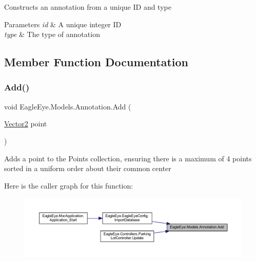 Constructs an annotation from a unique ID and type 


\begin{DoxyParams}{Parameters}
{\em id} & A unique integer ID\\
\hline
{\em type} & The type of annotation\\
\hline
\end{DoxyParams}


\subsection{Member Function Documentation}
\mbox{\label{class_eagle_eye_1_1_models_1_1_annotation_a47912a5775f0ead932d1cddb43213cd1}} 
\subsubsection{\texorpdfstring{Add()}{Add()}}
{\footnotesize\ttfamily void Eagle\+Eye.\+Models.\+Annotation.\+Add (\begin{DoxyParamCaption}\item[{\mbox{\hyperlink{struct_eagle_eye_1_1_models_1_1_geometry_1_1_vector2}{Vector2}}}]{point }\end{DoxyParamCaption})}



Adds a point to the Points collection, ensuring there is a maximum of 4 points sorted in a uniform order about their common center 

Here is the caller graph for this function\+:
\nopagebreak
\begin{figure}[H]
\begin{center}
\leavevmode
\includegraphics[width=350pt]{class_eagle_eye_1_1_models_1_1_annotation_a47912a5775f0ead932d1cddb43213cd1_icgraph}
\end{center}
\end{figure}
\mbox{\label{class_eagle_eye_1_1_models_1_1_annotation_afa6be3269640630b76dce0c9dee1a239}} 
